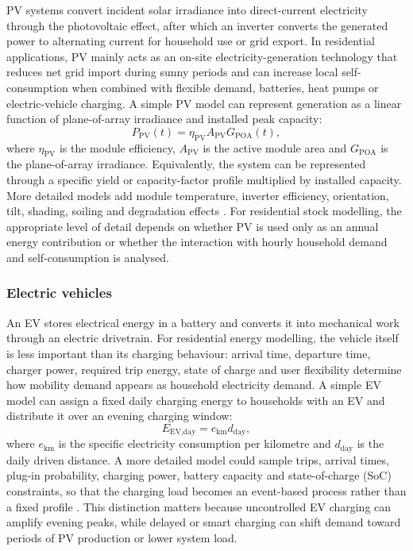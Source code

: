 PV systems convert incident solar irradiance into direct-current electricity through the photovoltaic effect, after which an inverter converts the generated power to alternating current for household use or grid export. In residential applications, PV mainly acts as an on-site electricity-generation technology that reduces net grid import during sunny periods and can increase local self-consumption when combined with flexible demand, batteries, heat pumps or electric-vehicle charging.
\newline A simple PV model can represent generation as a linear function of plane-of-array irradiance and installed peak capacity:
\begin{equation}
    P_\text{PV}(t) = \eta_\text{PV} A_\text{PV} G_\text{POA}(t),
\end{equation}
where $\eta_\text{PV}$ is the module efficiency, $A_\text{PV}$ is the active module area and $G_\text{POA}$ is the plane-of-array irradiance. Equivalently, the system can be represented through a specific yield or capacity-factor profile multiplied by installed capacity. More detailed models add module temperature, inverter efficiency, orientation, tilt, shading, soiling and degradation effects \cite{duffie2013_solar_engineering,desoto2006_solar_model}. 
\newline For residential stock modelling, the appropriate level of detail depends on whether PV is used only as an annual energy contribution or whether the interaction with hourly household demand and self-consumption is analysed.

\subsubsection*{Electric vehicles}
An EV stores electrical energy in a battery and converts it into mechanical work through an electric drivetrain. For residential energy modelling, the vehicle itself is less important than its charging behaviour: arrival time, departure time, charger power, required trip energy, state of charge and user flexibility determine how mobility demand appears as household electricity demand.
\newline A simple EV model can assign a fixed daily charging energy to households with an EV and distribute it over an evening charging window:
\begin{equation}
    E_\text{EV,day} = e_\text{km} d_\text{day},
\end{equation}
where $e_\text{km}$ is the specific electricity consumption per kilometre and $d_\text{day}$ is the daily driven distance. A more detailed model could sample trips, arrival times, plug-in probability, charging power, battery capacity and state-of-charge (SoC) constraints, so that the charging load becomes an event-based process rather than a fixed profile \cite{richardson2013_ev_demand,muratori2018_ev_charging}. This distinction matters because uncontrolled EV charging can amplify evening peaks, while delayed or smart charging can shift demand toward periods of PV production or lower system load.


